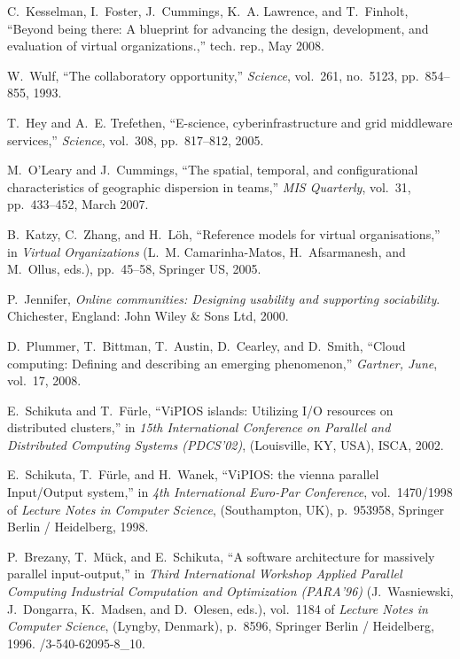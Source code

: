 \documentclass[]{article}
\begin{document}
\begin{thebibliography}{10}
C.~Kesselman, I.~Foster, J.~Cummings, K.~A. Lawrence, and T.~Finholt, ``Beyond
  being there: A blueprint for advancing the design, development, and
  evaluation of virtual organizations.,'' tech. rep., May 2008.

W.~Wulf, ``The collaboratory opportunity,'' {\em Science}, vol.~261, no.~5123,
  pp.~854--855, 1993.

T.~Hey and A.~E. Trefethen, ``E-science, cyberinfrastructure and grid
  middleware services,'' {\em Science}, vol.~308, pp.~817--812, 2005.

M.~O'Leary and J.~Cummings, ``The spatial, temporal, and configurational
  characteristics of geographic dispersion in teams,'' {\em MIS Quarterly},
  vol.~31, pp.~433--452, March 2007.

B.~Katzy, C.~Zhang, and H.~Löh, ``Reference models for virtual
  organisations,'' in {\em Virtual Organizations} (L.~M. Camarinha-Matos,
  H.~Afsarmanesh, and M.~Ollus, eds.), pp.~45--58, Springer US, 2005.

P.~Jennifer, {\em Online communities: Designing usability and supporting
  sociability}.
\newblock Chichester, England: John Wiley \& Sons Ltd, 2000.

D.~Plummer, T.~Bittman, T.~Austin, D.~Cearley, and D.~Smith, ``Cloud computing:
  Defining and describing an emerging phenomenon,'' {\em Gartner, June},
  vol.~17, 2008.

E.~Schikuta and T.~F\"{u}rle, ``{ViPIOS} islands: Utilizing {I/O} resources on
  distributed clusters,'' in {\em 15th International Conference on Parallel and
  Distributed Computing Systems {(PDCS'02)}}, (Louisville, {KY,} {USA}),
  {ISCA}, 2002.

E.~Schikuta, T.~F\"{u}rle, and H.~Wanek, ``{ViPIOS:} the vienna parallel
  {Input/Output} system,'' in {\em 4th International {Euro-Par} Conference},
  vol.~1470/1998 of {\em Lecture Notes in Computer Science}, (Southampton,
  {UK}), p.~953{\textendash}958, Springer Berlin / Heidelberg, 1998.

P.~Brezany, T.~M\"{u}ck, and E.~Schikuta, ``A software architecture for
  massively parallel input-output,'' in {\em Third International Workshop
  Applied Parallel Computing Industrial Computation and Optimization
  {(PARA'96)}} (J.~Wasniewski, J.~Dongarra, K.~Madsen, and D.~Olesen, eds.),
  vol.~1184 of {\em Lecture Notes in Computer Science}, (Lyngby, Denmark),
  p.~85{\textendash}96, Springer Berlin / Heidelberg, 1996.
/3-540-62095-8\_10.


\end{thebibliography}
\end{document}
